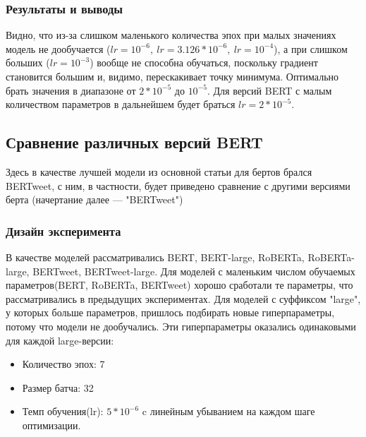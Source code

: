 \documentclass{article}
\begin{document}
\subsubsection{Результаты и выводы}
\begin{figure}[h]
	
    \caption{}
	\label{eq:lrs}
\end{figure}
Видно,  что из-за слишком маленького количества эпох при малых значениях модель не дообучается ($lr = 10^{-6},\ lr = 3.126 * 10^{-6},\ lr = 10^{-4}$), а при слишком больших ($lr = 10^{-3}$) вообще не способна обучаться, поскольку градиент становится большим и, видимо, перескакивает точку минимума. Оптимально брать значения в диапазоне от $2*10^{-5}$ до $10^{-5}$. Для версий BERT с малым количеством параметров в дальнейшем будет браться $lr=2*10^{-5}$.

\subsection{Сравнение различных версий BERT}
Здесь в качестве лучшей модели из основной статьи для бертов брался BERTweet, с ним, в частности, будет приведено сравнение с другими версиями берта (начертание далее --- "BERTweet")
\subsubsection{Дизайн эксперимента}
В качестве моделей рассматривались BERT, BERT-large, RoBERTa, RoBERTa-large, BERTweet, BERTweet-large. Для моделей с маленьким числом обучаемых параметров(BERT, RoBERTa, BERTweet) хорошо сработали те параметры, что рассматривались в предыдущих экспериментах. Для моделей с суффиксом "large"{}, у которых больше параметров, пришлось подбирать новые гиперпараметры, потому что модели не дообучались. Эти гиперпараметры оказались одинаковыми для каждой large-версии:
\begin{itemize}
    \item Количество эпох: 7
    \item Размер батча: 32
    \item Темп обучения(lr): $5 * 10^{-6}$ c линейным убыванием на каждом шаге оптимизации.
\end{itemize}
\end{document}
